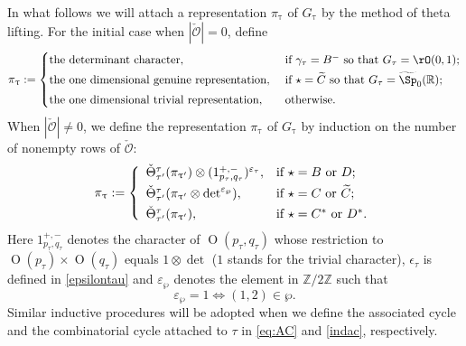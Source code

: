 \documentclass[11pt,a4paper]{amsart}
\newcommand{\CO}{{\mathcal {O}}}
\newcommand{\oO}{\operatorname{O}}
\newcommand{\Z}{\mathbb{Z}}
\newcommand{\R}{\mathbb R}
\numberwithin{equation}{section}
\theoremstyle{remark}
\begin{document}
 In what follows we will attach a representation $\pi_{\uptau}$ of $G_{\uptau}$ by the method of theta lifting. For the initial case when $|\check \CO|=0$,
 define
 \[
 \pi_{\uptau}:=
 \begin{cases}
 \textrm{the determinant character} , &\text{ if $\gamma _\tau=B^-$ so that $G_\tau=\rO(0,1)$;} \smallskip\\
 \textrm{the one dimensional genuine representation} , &\text{ if $\star=\widetilde C$ so that $G_\tau=\widetilde{\Sp}_0(\R)$;} \smallskip\\
 \textrm{the one dimensional trivial representation} , &\text{ otherwise.}
 \end{cases}
 \]
 When $|\check \CO|\neq 0$,   we define the representation $\pi_{\uptau}$ of $G_{\uptau}$ by induction on the number of nonempty rows of $\check \CO$:
 \begin{equation}\label{eq:def-pi}
    \pi_{\uptau}:=\left\{
     \begin{array}{ll}
         \check \Theta_{\tau'}^{\tau}(\pi_{\uptau'})\otimes (1_{p_\tau, q_\tau}^{+,-})^{\varepsilon_{\tau}}, &\hbox{if  $\star=B$ or $D$}; \smallskip \\
         \check \Theta_{\tau'}^{\tau}(\pi_{\uptau'}\otimes \det^{\varepsilon_{\wp}}), &\hbox{if $\star=C$ or $\widetilde C$};  \smallskip\\
              \check \Theta_{\tau'}^{\tau}(\pi_{\uptau'}), &\hbox{if $\star=C^*$ or $D^*$}. \\
            \end{array}
   \right.
 \end{equation}
 Here $1_{p_\tau, q_\tau}^{+,-}$ denotes the character of $\oO(p_\tau, q_\tau)$ whose restriction to $\oO(p_\tau)\times \oO(q_\tau)$ equals $1\otimes \det$ ($1$ stands for the trivial character), $\epsilon_{\tau}$ is defined in \eqref{epsilontau} and
$\varepsilon_{\wp}$ denotes the element in $\Z/2\Z$ such that  \[
 \varepsilon_{\wp}=1\Leftrightarrow  (1,2)\in \wp.
\]
Similar inductive procedures will be adopted when we define the associated cycle and the combinatorial cycle attached to $\tau$ in
\eqref{eq:AC} and \eqref{indac}, respectively.
\end{document}
